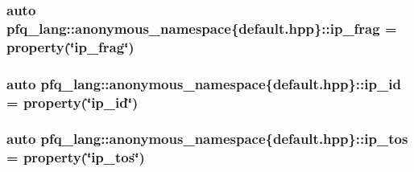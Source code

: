 \hypertarget{namespacepfq__lang_1_1anonymous__namespace_02default_8hpp_03_a29f207a5d209c3968f5d2e8f3c19c239}{
\subsubsection[{ip\+\_\+frag}]{\setlength{\rightskip}{0pt plus 5cm}auto pfq\+\_\+lang\+::anonymous\+\_\+namespace\{default.\+hpp\}\+::ip\+\_\+frag = {\bf property}(\char`\"{}ip\+\_\+frag\char`\"{})}}\label{namespacepfq__lang_1_1anonymous__namespace_02default_8hpp_03_a29f207a5d209c3968f5d2e8f3c19c239}
\hypertarget{namespacepfq__lang_1_1anonymous__namespace_02default_8hpp_03_a7e1fd2e2131451ca8afe2f8ab07b97a8}{
\subsubsection[{ip\+\_\+id}]{\setlength{\rightskip}{0pt plus 5cm}auto pfq\+\_\+lang\+::anonymous\+\_\+namespace\{default.\+hpp\}\+::ip\+\_\+id = {\bf property}(\char`\"{}ip\+\_\+id\char`\"{})}}\label{namespacepfq__lang_1_1anonymous__namespace_02default_8hpp_03_a7e1fd2e2131451ca8afe2f8ab07b97a8}
\hypertarget{namespacepfq__lang_1_1anonymous__namespace_02default_8hpp_03_afc29e9877341008196788bba2bde3e04}{
\subsubsection[{ip\+\_\+tos}]{\setlength{\rightskip}{0pt plus 5cm}auto pfq\+\_\+lang\+::anonymous\+\_\+namespace\{default.\+hpp\}\+::ip\+\_\+tos = {\bf property}(\char`\"{}ip\+\_\+tos\char`\"{})}}\label{namespacepfq__lang_1_1anonymous__namespace_02default_8hpp_03_afc29e9877341008196788bba2bde3e04}
